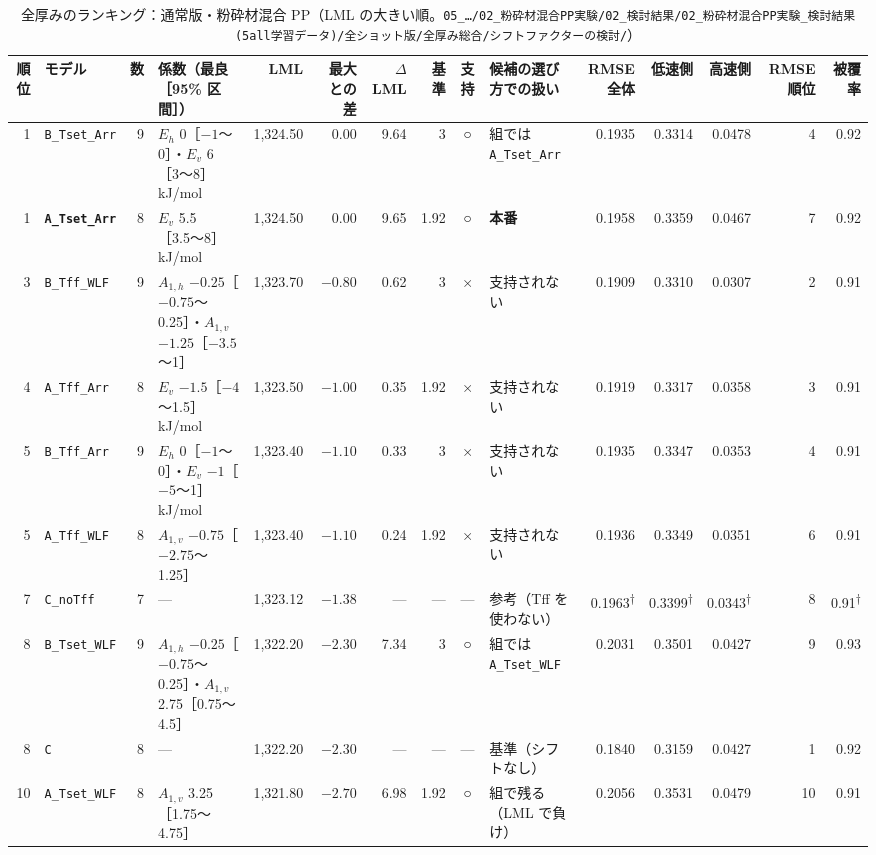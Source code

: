 \documentclass[paper=a4paper,landscape,fontsize=10pt,line_length=62zw,number_of_lines=34]{jlreq}
\let\origtextbf\textbf
\renewcommand{\textbf}[1]{\origtextbf{\gtfamily #1}}   %
\begin{document}
\begin{table}[H]\centering\footnotesize
\caption{全厚みのランキング：通常版・粉砕材混合 PP（LML の大きい順。\texttt{05\_\allowbreak{}…/\allowbreak{}02\_\allowbreak{}粉砕材混合PP実験/\allowbreak{}02\_\allowbreak{}検討結果/\allowbreak{}02\_\allowbreak{}粉砕材混合PP実験\_\allowbreak{}検討結果(5all学習データ)/\allowbreak{}全ショット版/\allowbreak{}全厚み総合/\allowbreak{}シフトファクターの検討/\allowbreak{}}）}
\begin{tabular}{rlrp{12\zw}rrrrcp{8.5\zw}rrrrr}
\toprule
順位 & モデル & 数 & 係数（最良［95\% 区間］） & LML & 最大との差 & $\Delta$LML & 基準 & 支持 & 候補の選び方での扱い & RMSE 全体 & 低速側 & 高速側 & RMSE 順位 & 被覆率 \\
\midrule
1 & \texttt{B\_\allowbreak{}Tset\_\allowbreak{}Arr} & 9 & $E_h$ 0［$-1$〜0］・$E_v$ 6［3〜8］ kJ/mol & 1,324.50 & 0.00 & 9.64 & 3 & ○ & 組では \texttt{A\_\allowbreak{}Tset\_\allowbreak{}Arr} & 0.1935 & 0.3314 & 0.0478 & 4 & 0.92 \\
1 & \textbf{\texttt{A\_\allowbreak{}Tset\_\allowbreak{}Arr}} & 8 & $E_v$ 5.5［3.5〜8］ kJ/mol & 1,324.50 & 0.00 & 9.65 & 1.92 & ○ & \textbf{本番} & 0.1958 & 0.3359 & 0.0467 & 7 & 0.92 \\
3 & \texttt{B\_\allowbreak{}Tff\_\allowbreak{}WLF} & 9 & $A_{1,h}$ $-0.25$［$-0.75$〜0.25］・$A_{1,v}$ $-1.25$［$-3.5$〜1］ & 1,323.70 & $-0.80$ & 0.62 & 3 & × & 支持されない & 0.1909 & 0.3310 & 0.0307 & 2 & 0.91 \\
4 & \texttt{A\_\allowbreak{}Tff\_\allowbreak{}Arr} & 8 & $E_v$ $-1.5$［$-4$〜1.5］ kJ/mol & 1,323.50 & $-1.00$ & 0.35 & 1.92 & × & 支持されない & 0.1919 & 0.3317 & 0.0358 & 3 & 0.91 \\
5 & \texttt{B\_\allowbreak{}Tff\_\allowbreak{}Arr} & 9 & $E_h$ 0［$-1$〜0］・$E_v$ $-1$［$-5$〜1］ kJ/mol & 1,323.40 & $-1.10$ & 0.33 & 3 & × & 支持されない & 0.1935 & 0.3347 & 0.0353 & 4 & 0.91 \\
5 & \texttt{A\_\allowbreak{}Tff\_\allowbreak{}WLF} & 8 & $A_{1,v}$ $-0.75$［$-2.75$〜1.25］ & 1,323.40 & $-1.10$ & 0.24 & 1.92 & × & 支持されない & 0.1936 & 0.3349 & 0.0351 & 6 & 0.91 \\
7 & \texttt{C\_\allowbreak{}noTff} & 7 & --- & 1,323.12 & $-1.38$ & --- & --- & --- & 参考（Tff を使わない） & 0.1963\textsuperscript{†} & 0.3399\textsuperscript{†} & 0.0343\textsuperscript{†} & 8 & 0.91\textsuperscript{†} \\
8 & \texttt{B\_\allowbreak{}Tset\_\allowbreak{}WLF} & 9 & $A_{1,h}$ $-0.25$［$-0.75$〜0.25］・$A_{1,v}$ 2.75［0.75〜4.5］ & 1,322.20 & $-2.30$ & 7.34 & 3 & ○ & 組では \texttt{A\_\allowbreak{}Tset\_\allowbreak{}WLF} & 0.2031 & 0.3501 & 0.0427 & 9 & 0.93 \\
8 & \texttt{C} & 8 & --- & 1,322.20 & $-2.30$ & --- & --- & --- & 基準（シフトなし） & 0.1840 & 0.3159 & 0.0427 & 1 & 0.92 \\
10 & \texttt{A\_\allowbreak{}Tset\_\allowbreak{}WLF} & 8 & $A_{1,v}$ 3.25［1.75〜4.75］ & 1,321.80 & $-2.70$ & 6.98 & 1.92 & ○ & 組で残る（LML で負け） & 0.2056 & 0.3531 & 0.0479 & 10 & 0.91 \\
\bottomrule
\end{tabular}
\end{table}
\end{document}
